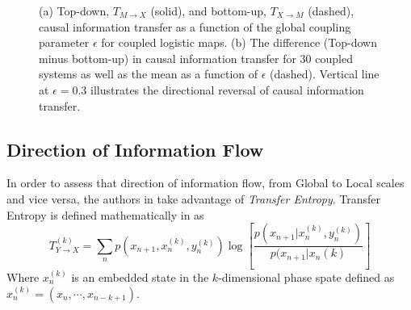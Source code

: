\documentclass[conference]{IEEEtran}
\begin{document}
\begin{figure}[!t]
\centering
{}
\hfill
{}
\caption{(a) Top-down, $T_{M\rightarrow X}$ (solid), and bottom-up, $T_{X\rightarrow M}$ (dashed), causal information transfer as a function of the global coupling parameter $\epsilon$ for coupled logistic maps. (b) The difference (Top-down minus bottom-up) in causal information transfer for $30$ coupled systems as well as the mean as a function of $\epsilon$ (dashed). Vertical line at $\epsilon = 0.3$ illustrates the directional reversal of causal information transfer.}
\label{te_avg}
\end{figure}

\subsection{Direction of Information Flow}
\noindent In order to assess that direction of information flow, from Global to Local scales and vice versa, the authors in \cite{Walker} take advantage of {\it Transfer Entropy}. Transfer Entropy is defined mathematically in \cite{Schreiber} as
$$T^{(k)}_{Y \rightarrow X} = \sum_n p(x_{n+1}, x_n^{(k)}, y_n^{(k)}) \log \left[ \frac{p(x_{n+1}|x_n^{(k)}, y_n^{(k)})}{p(x_{n+1}|x_n{(k)}}\right]$$
Where $x_n^{(k)}$ is an embedded state in the $k$-dimensional phase spate defined as $x_n^{(k)} = (x_n, \cdots, x_{n-k+1})$. \\
\end{document}
